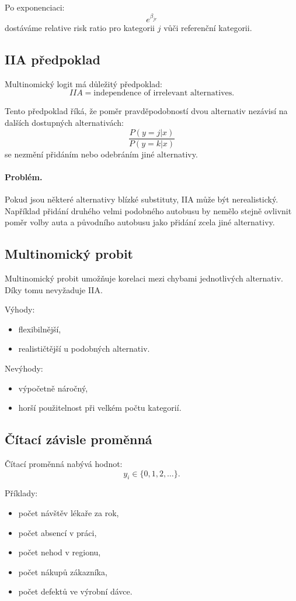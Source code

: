 Po exponenciaci:
\[
e^{\beta_{jr}}
\]
dostáváme relative risk ratio pro kategorii $j$ vůči referenční kategorii.

\subsection{IIA předpoklad}

Multinomický logit má důležitý předpoklad:
\[
IIA = \text{independence of irrelevant alternatives}.
\]

Tento předpoklad říká, že poměr pravděpodobností dvou alternativ nezávisí na dalších dostupných
alternativách:
\[
\frac{P(y=j|x)}{P(y=k|x)}
\]
se nezmění přidáním nebo odebráním jiné alternativy.

\paragraph{Problém.}
Pokud jsou některé alternativy blízké substituty, IIA může být nerealistický. Například přidání druhého
velmi podobného autobusu by nemělo stejně ovlivnit poměr volby auta a původního autobusu jako přidání
zcela jiné alternativy.

\subsection{Multinomický probit}

Multinomický probit umožňuje korelaci mezi chybami jednotlivých alternativ. Díky tomu nevyžaduje IIA.

Výhody:
\begin{itemize}
    \item flexibilnější,
    \item realističtější u podobných alternativ.
\end{itemize}

Nevýhody:
\begin{itemize}
    \item výpočetně náročný,
    \item horší použitelnost při velkém počtu kategorií.
\end{itemize}

\subsection{Čítací závisle proměnná}

Čítací proměnná nabývá hodnot:
\[
y_i\in\{0,1,2,\ldots\}.
\]

Příklady:
\begin{itemize}
    \item počet návštěv lékaře za rok,
    \item počet absencí v práci,
    \item počet nehod v regionu,
    \item počet nákupů zákazníka,
    \item počet defektů ve výrobní dávce.
\end{itemize}


